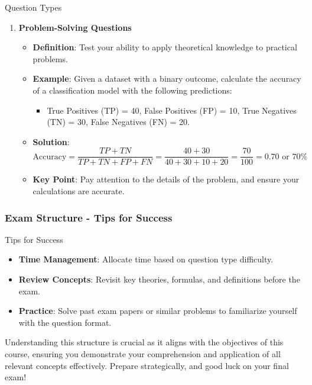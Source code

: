 \documentclass[aspectratio=169]{beamer}
\begin{document}
\begin{frame}[fragile]
\begin{block}{Question Types}
\begin{enumerate}
            \item \textbf{Problem-Solving Questions}
                \begin{itemize}
                    \item \textbf{Definition}: Test your ability to apply theoretical knowledge to practical problems.
                    \item \textbf{Example}: Given a dataset with a binary outcome, calculate the accuracy of a classification model with the following predictions:
                        \begin{itemize}
                            \item True Positives (TP) = 40, False Positives (FP) = 10, True Negatives (TN) = 30, False Negatives (FN) = 20.
                        \end{itemize}
                    \item \textbf{Solution}:
                    \begin{equation}
                        \text{Accuracy} = \frac{TP + TN}{TP + TN + FP + FN} = \frac{40 + 30}{40 + 30 + 10 + 20} = \frac{70}{100} = 0.70 \text{ or } 70\%
                    \end{equation}
                    \item \textbf{Key Point}: Pay attention to the details of the problem, and ensure your calculations are accurate.
                \end{itemize}
        \end{enumerate}
    \end{block}
\end{frame}

\begin{frame}[fragile]
    \frametitle{Exam Structure - Tips for Success}
    \begin{block}{Tips for Success}
        \begin{itemize}
            \item \textbf{Time Management}: Allocate time based on question type difficulty.
            \item \textbf{Review Concepts}: Revisit key theories, formulas, and definitions before the exam.
            \item \textbf{Practice}: Solve past exam papers or similar problems to familiarize yourself with the question format.
        \end{itemize}
    \end{block}
    
    Understanding this structure is crucial as it aligns with the objectives of this course, ensuring you demonstrate your comprehension and application of all relevant concepts effectively. Prepare strategically, and good luck on your final exam!
\end{frame}
\end{document}
